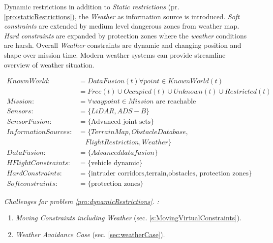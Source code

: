 \begin{problem}{Dynamic restrictions}\label{pro:dynamicRestrictions}
    in addition to \emph{Static restrictions} (pr. \ref{pro:staticRestrictions}), the \emph{Weather} as information source is introduced. \emph{Soft constraints} are extended by medium level dangerous zones from weather map. \emph{Hard constraints} are expanded by protection zones where the \emph{weather} conditions are harsh. Overall \emph{Weather} constraints are dynamic and changing position and shape over mission time. Modern weather systems can provide streamline overview of weather situation. 
    
    \begin{equation}\label{eq:dynamicRestrictionsProblemDefinition}
        \begin{aligned}
            KnownWorld:&= DataFusion(t)\forall point\in KnownWorld(t)\\
                       &=Free(t) \cup Occupied(t) \cup Unknown(t) \cup Restricted(t)\\
            Mission:&= \forall waypoint\in Mission \text{ are reachable}\\
            Sensors:&= \{LiDAR,ADS-B\}\\
            SensorFusion:&= \{\text{Advanced joint sets}\}\\
            InformationSources:&=\{Terrain Map,Obstacle Database,\\
                               &\quad Flight Restriction,Weather\}\\
            DataFusion:&= \{Advanced data fusion\}\\
            HFlightConstraints:&=\{\text{vehicle dynamic}\}\\
            HardConstraints:&=\{\text{intruder corridors,terrain,obstacles, protection zones}\}\\
            Softconstraints:&=\{\text{protection zones}\}
        \end{aligned}
    \end{equation}
    
    \noindent \emph{Challenges for problem  \ref{pro:dynamicRestrictions}. :}
    \begin{enumerate}
        \item\emph{Moving Constraints including Weather} (sec. \ref{s:MovingVirtualConstraints}).
        \item\emph{Weather Avoidance Case} (sec. \ref{sec:weatherCase}).
    \end{enumerate}
\end{problem}


